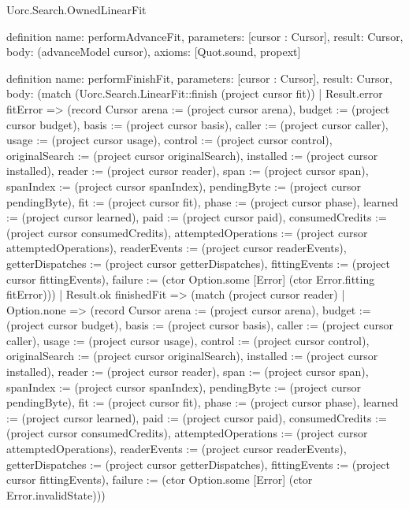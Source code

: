\begin{lexlean}{Uorc.Search.OwnedLinearFit}
\begin{semanticmodule}
definition{
  name: performAdvanceFit,
  parameters: [cursor : Cursor],
  result: Cursor,
  body: (advanceModel cursor),
  axioms: [Quot.sound, propext]
}

definition{
  name: performFinishFit,
  parameters: [cursor : Cursor],
  result: Cursor,
  body: (match (Uorc.Search.LinearFit::finish (project cursor fit))
    | Result.error fitError => (record Cursor {arena := (project cursor arena), budget := (project cursor budget), basis := (project cursor basis), caller := (project cursor caller), usage := (project cursor usage), control := (project cursor control), originalSearch := (project cursor originalSearch), installed := (project cursor installed), reader := (project cursor reader), span := (project cursor span), spanIndex := (project cursor spanIndex), pendingByte := (project cursor pendingByte), fit := (project cursor fit), phase := (project cursor phase), learned := (project cursor learned), paid := (project cursor paid), consumedCredits := (project cursor consumedCredits), attemptedOperations := (project cursor attemptedOperations), readerEvents := (project cursor readerEvents), getterDispatches := (project cursor getterDispatches), fittingEvents := (project cursor fittingEvents), failure := (ctor Option.some [Error] (ctor Error.fitting fitError))})
    | Result.ok finishedFit => (match (project cursor reader)
      | Option.none => (record Cursor {arena := (project cursor arena), budget := (project cursor budget), basis := (project cursor basis), caller := (project cursor caller), usage := (project cursor usage), control := (project cursor control), originalSearch := (project cursor originalSearch), installed := (project cursor installed), reader := (project cursor reader), span := (project cursor span), spanIndex := (project cursor spanIndex), pendingByte := (project cursor pendingByte), fit := (project cursor fit), phase := (project cursor phase), learned := (project cursor learned), paid := (project cursor paid), consumedCredits := (project cursor consumedCredits), attemptedOperations := (project cursor attemptedOperations), readerEvents := (project cursor readerEvents), getterDispatches := (project cursor getterDispatches), fittingEvents := (project cursor fittingEvents), failure := (ctor Option.some [Error] (ctor Error.invalidState))})
}
\end{semanticmodule}
\end{lexlean}
